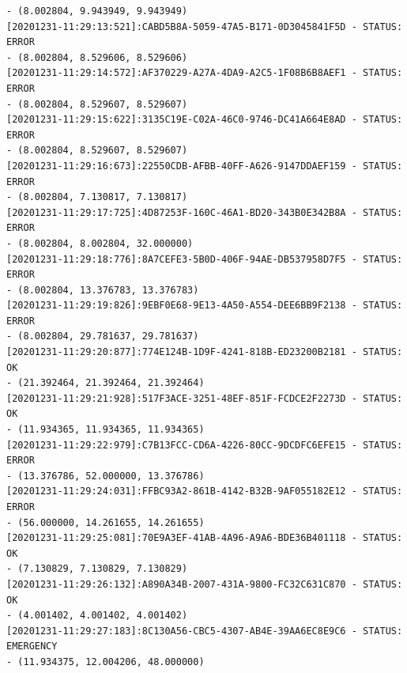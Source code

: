 \documentclass[11pt, oneside]{article}   	%
\begin{document}
\begin{Verbatim}[frame=topline,
			framesep=4mm,
			label=\fbox{\Large{STATUS\_20201231.log}}]
- (8.002804, 9.943949, 9.943949)
[20201231-11:29:13:521]:CABD5B8A-5059-47A5-B171-0D3045841F5D - STATUS: ERROR     
- (8.002804, 8.529606, 8.529606)
[20201231-11:29:14:572]:AF370229-A27A-4DA9-A2C5-1F08B6B8AEF1 - STATUS: ERROR     
- (8.002804, 8.529607, 8.529607)
[20201231-11:29:15:622]:3135C19E-C02A-46C0-9746-DC41A664E8AD - STATUS: ERROR     
- (8.002804, 8.529607, 8.529607)
[20201231-11:29:16:673]:22550CDB-AFBB-40FF-A626-9147DDAEF159 - STATUS: ERROR     
- (8.002804, 7.130817, 7.130817)
[20201231-11:29:17:725]:4D87253F-160C-46A1-BD20-343B0E342B8A - STATUS: ERROR     
- (8.002804, 8.002804, 32.000000)
[20201231-11:29:18:776]:8A7CEFE3-5B0D-406F-94AE-DB537958D7F5 - STATUS: ERROR     
- (8.002804, 13.376783, 13.376783)
[20201231-11:29:19:826]:9EBF0E68-9E13-4A50-A554-DEE6BB9F2138 - STATUS: ERROR     
- (8.002804, 29.781637, 29.781637)
[20201231-11:29:20:877]:774E124B-1D9F-4241-818B-ED23200B2181 - STATUS: OK        
- (21.392464, 21.392464, 21.392464)
[20201231-11:29:21:928]:517F3ACE-3251-48EF-851F-FCDCE2F2273D - STATUS: OK        
- (11.934365, 11.934365, 11.934365)
[20201231-11:29:22:979]:C7B13FCC-CD6A-4226-80CC-9DCDFC6EFE15 - STATUS: ERROR     
- (13.376786, 52.000000, 13.376786)
[20201231-11:29:24:031]:FFBC93A2-861B-4142-B32B-9AF055182E12 - STATUS: ERROR     
- (56.000000, 14.261655, 14.261655)
[20201231-11:29:25:081]:70E9A3EF-41AB-4A96-A9A6-BDE36B401118 - STATUS: OK        
- (7.130829, 7.130829, 7.130829)
[20201231-11:29:26:132]:A890A34B-2007-431A-9800-FC32C631C870 - STATUS: OK        
- (4.001402, 4.001402, 4.001402)
[20201231-11:29:27:183]:8C130A56-CBC5-4307-AB4E-39AA6EC8E9C6 - STATUS: EMERGENCY 
- (11.934375, 12.004206, 48.000000)
\end{Verbatim}

\newpage
\end{document}
